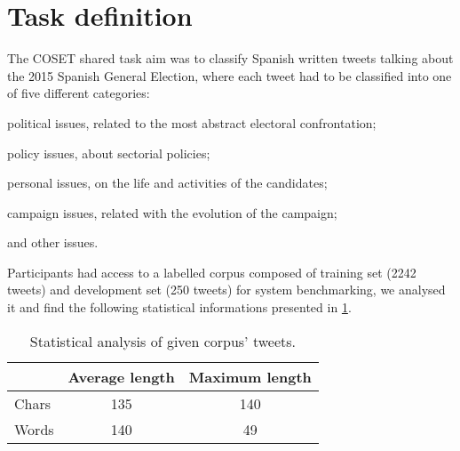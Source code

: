 \section{Task definition} \label{sec:task}

The COSET shared task aim was to classify Spanish written tweets talking about the 2015 Spanish General Election, where each tweet had to be classified into one of five different categories:
\begin{enumerate*}
\item political issues, related to the most abstract electoral confrontation; 
\item policy issues, about sectorial policies; 
\item personal issues, on the life and activities of the candidates; 
\item campaign issues, related with the evolution of the campaign;
\item and other issues.
\end{enumerate*}


Participants had access to a labelled corpus composed of training set (2242 tweets) and development set (250 tweets) for system benchmarking, we analysed it and find the following statistical informations presented in \cref{tab:corpus}.

\begin{table}[h]
\footnotesize
\centering
\begin{tabular}{l|cc}
\toprule
\hline
			& Average length	& Maximum length	\\ \hline
Chars		& 135				& 140				\\ 
Words		& 140				& 49				\\ 
\hline
\bottomrule
\end{tabular}
\caption{Statistical analysis of given corpus' tweets.}
\label{tab:corpus}
\end{table}
